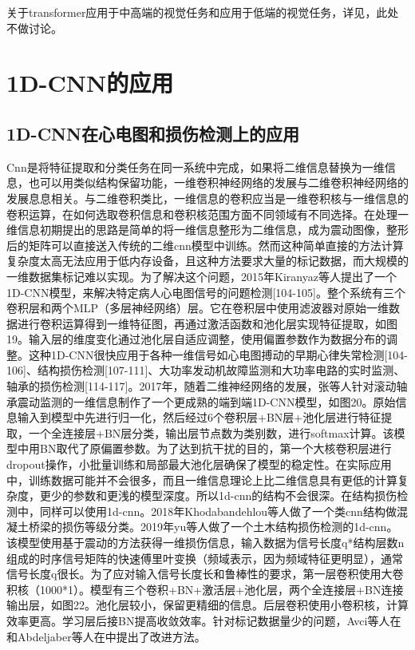 \documentclass[15pt]{article}
\begin{document}
关于transformer应用于中高端的视觉任务和应用于低端的视觉任务，详见\cite{ref96}，此处不做讨论。

\section{1D-CNN的应用}
\subsection{1D-CNN在心电图和损伤检测上的应用}

Cnn是将特征提取和分类任务在同一系统中完成，如果将二维信息替换为一维信息，也可以用类似结构保留功能，一维卷积神经网络的发展与二维卷积神经网络的发展息息相关。与二维卷积类比，一维信息的卷积应当是一维卷积核与一维信息的卷积运算，在如何选取卷积信息和卷积核范围方面不同领域有不同选择。在处理一维信息初期提出的思路是简单的将一维信息整形为二维信息，成为震动图像\cite{ref102}\cite{ref103}，整形后的矩阵可以直接送入传统的二维cnn模型中训练。然而这种简单直接的方法计算复杂度太高无法应用于低内存设备，且这种方法要求大量的标记数据，而大规模的一维数据集标记难以实现。为了解决这个问题，2015年Kiranyaz等人提出了一个1D-CNN模型，来解决特定病人心电图信号的问题检测[104-105]。整个系统有三个卷积层和两个MLP（多层神经网络）层。它在卷积层中使用滤波器对原始一维数据进行卷积运算得到一维特征图，再通过激活函数和池化层实现特征提取，如图19。输入层的维度变化通过池化层自适应调整，使用偏置参数作为数据分布的调整。这种1D-CNN很快应用于各种一维信号如心电图搏动的早期心律失常检测[104-106]、结构损伤检测[107-111]、大功率发动机故障监测\cite{ref112}和大功率电路的实时监测\cite{ref113}、轴承的损伤检测[114-117]。2017年，随着二维神经网络的发展，张等人针对滚动轴承震动监测的一维信息制作了一个更成熟的端到端1D-CNN模型，如图20。原始信息输入到模型中先进行归一化，然后经过6个卷积层+BN层+池化层进行特征提取，一个全连接层+BN层分类，输出层节点数为类别数，进行softmax计算。该模型中用BN取代了原偏置参数。为了达到抗干扰的目的，第一个大核卷积层进行dropout操作，小批量训练和局部最大池化层确保了模型的稳定性。在实际应用中，训练数据可能并不会很多，而且一维信息理论上比二维信息具有更低的计算复杂度，更少的参数和更浅的模型深度。所以1d-cnn的结构不会很深。在结构损伤检测中，同样可以使用1d-cnn\cite{ref118}。2018年Khodabandehlou等人做了一个类cnn结构做混凝土桥梁的损伤等级分类\cite{ref120}。2019年yu等人做了一个土木结构损伤检测的1d-cnn\cite{ref119}。该模型使用基于震动的方法获得一维损伤信息，输入数据为信号长度q*结构层数n组成的时序信号矩阵的快速傅里叶变换（频域表示，因为频域特征更明显），通常信号长度q很长。为了应对输入信号长度长和鲁棒性的要求，第一层卷积使用大卷积核（1000*1）。模型有三个卷积+BN+激活层+池化层，两个全连接层+BN连接输出层，如图22。池化层较小，保留更精细的信息。后层卷积使用小卷积核，计算效率更高。学习层后接BN提高收敛效率。针对标记数据量少的问题，Avci等人在\cite{ref121}和Abdeljaber等人在\cite{ref122}中提出了改进方法。
\end{document}
